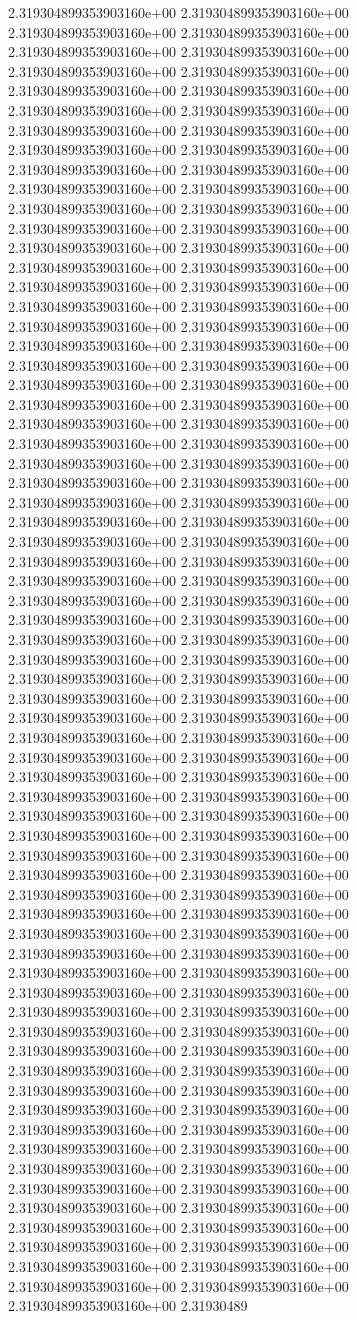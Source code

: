 	2.319304899353903160e+00	2.319304899353903160e+00	2.319304899353903160e+00	2.319304899353903160e+00	2.319304899353903160e+00	2.319304899353903160e+00	2.319304899353903160e+00	2.319304899353903160e+00	2.319304899353903160e+00	2.319304899353903160e+00	2.319304899353903160e+00	2.319304899353903160e+00	2.319304899353903160e+00	2.319304899353903160e+00	2.319304899353903160e+00	2.319304899353903160e+00	2.319304899353903160e+00	2.319304899353903160e+00	2.319304899353903160e+00	2.319304899353903160e+00	2.319304899353903160e+00	2.319304899353903160e+00	2.319304899353903160e+00	2.319304899353903160e+00	2.319304899353903160e+00	2.319304899353903160e+00	2.319304899353903160e+00	2.319304899353903160e+00	2.319304899353903160e+00	2.319304899353903160e+00	2.319304899353903160e+00	2.319304899353903160e+00	2.319304899353903160e+00	2.319304899353903160e+00	2.319304899353903160e+00	2.319304899353903160e+00	2.319304899353903160e+00	2.319304899353903160e+00	2.319304899353903160e+00	2.319304899353903160e+00	2.319304899353903160e+00	2.319304899353903160e+00	2.319304899353903160e+00	2.319304899353903160e+00	2.319304899353903160e+00	2.319304899353903160e+00	2.319304899353903160e+00	2.319304899353903160e+00	2.319304899353903160e+00	2.319304899353903160e+00	2.319304899353903160e+00	2.319304899353903160e+00	2.319304899353903160e+00	2.319304899353903160e+00	2.319304899353903160e+00	2.319304899353903160e+00	2.319304899353903160e+00	2.319304899353903160e+00	2.319304899353903160e+00	2.319304899353903160e+00	2.319304899353903160e+00	2.319304899353903160e+00	2.319304899353903160e+00	2.319304899353903160e+00	2.319304899353903160e+00	2.319304899353903160e+00	2.319304899353903160e+00	2.319304899353903160e+00	2.319304899353903160e+00	2.319304899353903160e+00	2.319304899353903160e+00	2.319304899353903160e+00	2.319304899353903160e+00	2.319304899353903160e+00	2.319304899353903160e+00	2.319304899353903160e+00	2.319304899353903160e+00	2.319304899353903160e+00	2.319304899353903160e+00	2.319304899353903160e+00	2.319304899353903160e+00	2.319304899353903160e+00	2.319304899353903160e+00	2.319304899353903160e+00	2.319304899353903160e+00	2.319304899353903160e+00	2.319304899353903160e+00	2.319304899353903160e+00	2.319304899353903160e+00	2.319304899353903160e+00	2.319304899353903160e+00	2.319304899353903160e+00	2.319304899353903160e+00	2.319304899353903160e+00	2.319304899353903160e+00	2.319304899353903160e+00	2.319304899353903160e+00	2.319304899353903160e+00	2.319304899353903160e+00	2.319304899353903160e+00	2.319304899353903160e+00	2.319304899353903160e+00	2.319304899353903160e+00	2.319304899353903160e+00	2.319304899353903160e+00	2.319304899353903160e+00	2.319304899353903160e+00	2.319304899353903160e+00	2.319304899353903160e+00	2.319304899353903160e+00	2.319304899353903160e+00	2.319304899353903160e+00	2.319304899353903160e+00	2.319304899353903160e+00	2.319304899353903160e+00	2.319304899353903160e+00	2.319304899353903160e+00	2.319304899353903160e+00	2.319304899353903160e+00	2.319304899353903160e+00	2.319304899353903160e+00	2.319304899353903160e+00	2.319304899353903160e+00	2.319304899353903160e+00	2.319304899353903160e+00	2.319304899353903160e+00	2.319304899353903160e+00	2.319304899353903160e+00	2.319304899353903160e+00	2.319304899353903160e+00	2.319304899353903160e+00	2.319304899353903160e+00	2.319304899353903160e+00	2.31930489